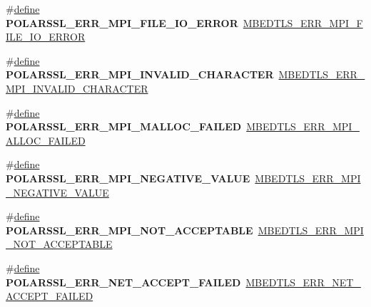 \begin{DoxyCompactItemize}
\#\hyperlink{structdefine}{define} {\bfseries P\+O\+L\+A\+R\+S\+S\+L\+\_\+\+E\+R\+R\+\_\+\+M\+P\+I\+\_\+\+F\+I\+L\+E\+\_\+\+I\+O\+\_\+\+E\+R\+R\+OR}~\hyperlink{bignum_8h_a5ba505f058780047978dcdafd50d0b1e}{M\+B\+E\+D\+T\+L\+S\+\_\+\+E\+R\+R\+\_\+\+M\+P\+I\+\_\+\+F\+I\+L\+E\+\_\+\+I\+O\+\_\+\+E\+R\+R\+OR}
\item 
\mbox{\label{compat-1_83_8h_af2d758961ae9e4085d2a43588ecb782a}} 
\#\hyperlink{structdefine}{define} {\bfseries P\+O\+L\+A\+R\+S\+S\+L\+\_\+\+E\+R\+R\+\_\+\+M\+P\+I\+\_\+\+I\+N\+V\+A\+L\+I\+D\+\_\+\+C\+H\+A\+R\+A\+C\+T\+ER}~\hyperlink{bignum_8h_a0ef495d9a083d986f00e5f604126382f}{M\+B\+E\+D\+T\+L\+S\+\_\+\+E\+R\+R\+\_\+\+M\+P\+I\+\_\+\+I\+N\+V\+A\+L\+I\+D\+\_\+\+C\+H\+A\+R\+A\+C\+T\+ER}
\item 
\mbox{\label{compat-1_83_8h_ad288a13737d14f102748c3184ed5a494}} 
\#\hyperlink{structdefine}{define} {\bfseries P\+O\+L\+A\+R\+S\+S\+L\+\_\+\+E\+R\+R\+\_\+\+M\+P\+I\+\_\+\+M\+A\+L\+L\+O\+C\+\_\+\+F\+A\+I\+L\+ED}~\hyperlink{bignum_8h_a9bb66b22357ba30dedfe856efeab5544}{M\+B\+E\+D\+T\+L\+S\+\_\+\+E\+R\+R\+\_\+\+M\+P\+I\+\_\+\+A\+L\+L\+O\+C\+\_\+\+F\+A\+I\+L\+ED}
\item 
\mbox{\label{compat-1_83_8h_afbbffbd20b56d2b8f3db8edf76cdbdb4}} 
\#\hyperlink{structdefine}{define} {\bfseries P\+O\+L\+A\+R\+S\+S\+L\+\_\+\+E\+R\+R\+\_\+\+M\+P\+I\+\_\+\+N\+E\+G\+A\+T\+I\+V\+E\+\_\+\+V\+A\+L\+UE}~\hyperlink{bignum_8h_ab7f06e7dfde557a02fe7137d4d47eed3}{M\+B\+E\+D\+T\+L\+S\+\_\+\+E\+R\+R\+\_\+\+M\+P\+I\+\_\+\+N\+E\+G\+A\+T\+I\+V\+E\+\_\+\+V\+A\+L\+UE}
\item 
\mbox{\label{compat-1_83_8h_ac42cb2c2b13df48182ee833de2e4adbf}} 
\#\hyperlink{structdefine}{define} {\bfseries P\+O\+L\+A\+R\+S\+S\+L\+\_\+\+E\+R\+R\+\_\+\+M\+P\+I\+\_\+\+N\+O\+T\+\_\+\+A\+C\+C\+E\+P\+T\+A\+B\+LE}~\hyperlink{bignum_8h_a24f0dfbee8599f6e72852247d5681503}{M\+B\+E\+D\+T\+L\+S\+\_\+\+E\+R\+R\+\_\+\+M\+P\+I\+\_\+\+N\+O\+T\+\_\+\+A\+C\+C\+E\+P\+T\+A\+B\+LE}
\item 
\mbox{\label{compat-1_83_8h_ad82bbf5012b60516118c5b85e4a73db9}} 
\#\hyperlink{structdefine}{define} {\bfseries P\+O\+L\+A\+R\+S\+S\+L\+\_\+\+E\+R\+R\+\_\+\+N\+E\+T\+\_\+\+A\+C\+C\+E\+P\+T\+\_\+\+F\+A\+I\+L\+ED}~\hyperlink{net__sockets_8h_a030cd35e75797c983c61152fd36bd135}{M\+B\+E\+D\+T\+L\+S\+\_\+\+E\+R\+R\+\_\+\+N\+E\+T\+\_\+\+A\+C\+C\+E\+P\+T\+\_\+\+F\+A\+I\+L\+ED}

\end{DoxyCompactItemize}
